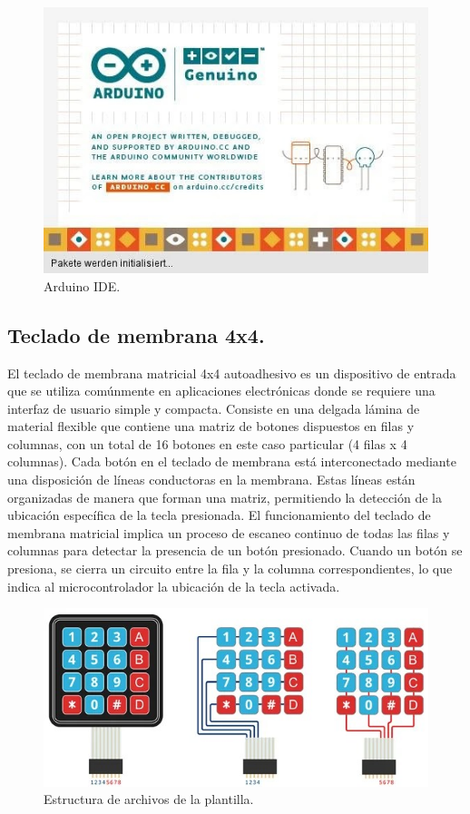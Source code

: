 \begin{figure}[H]
    \centering 
    \includegraphics[scale=0.5]{./imagenes/arduinoIDE.jpg}
    \caption{Arduino IDE.}
    \label{F:arduinoIDE}
\end{figure}

\subsection{Teclado de membrana 4x4.}
El teclado de membrana matricial 4x4 autoadhesivo es un dispositivo de entrada que se utiliza comúnmente en aplicaciones electrónicas donde se requiere una interfaz de usuario simple y compacta. Consiste en una delgada lámina de material flexible que contiene una matriz de botones dispuestos en filas y columnas, con un total de 16 botones en este caso particular (4 filas x 4 columnas).
Cada botón en el teclado de membrana está interconectado mediante una disposición de líneas conductoras en la membrana. Estas líneas están organizadas de manera que forman una matriz, permitiendo la detección de la ubicación específica de la tecla presionada. El funcionamiento del teclado de membrana matricial implica un proceso de escaneo continuo de todas las filas y columnas para detectar la presencia de un botón presionado. Cuando un botón se presiona, se cierra un circuito entre la fila y la columna correspondientes, lo que indica al microcontrolador la ubicación de la tecla activada.

\begin{figure}[H]
    \centering 
    \includegraphics[scale=0.5]{./imagenes/Teclado Matricial 4x4_2.jpg}
    \caption{Estructura de archivos de la plantilla.}
    \label{F:teclado4x4}
\end{figure}

